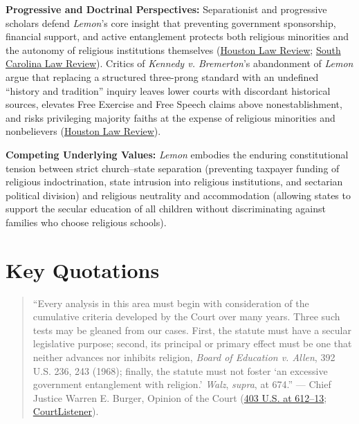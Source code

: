 \documentclass[12pt]{article}
\begin{document}
\textbf{Progressive and Doctrinal Perspectives:} Separationist and progressive scholars defend \textit{Lemon}'s core insight that preventing government sponsorship, financial support, and active entanglement protects both religious minorities and the autonomy of religious institutions themselves (\href{https://houstonlawreview.org/article/92811-unprincipled}{Houston Law Review}; \href{https://sclawreview.org/article/establishment-clause-jurisprudence-and-the-constitutional-limits-on-religion-in-public-schools/}{South Carolina Law Review}). Critics of \textit{Kennedy v. Bremerton}'s abandonment of \textit{Lemon} argue that replacing a structured three-prong standard with an undefined ``history and tradition'' inquiry leaves lower courts with discordant historical sources, elevates Free Exercise and Free Speech claims above nonestablishment, and risks privileging majority faiths at the expense of religious minorities and nonbelievers (\href{https://houstonlawreview.org/article/92811-unprincipled}{Houston Law Review}).

\textbf{Competing Underlying Values:} \textit{Lemon} embodies the enduring constitutional tension between strict church--state separation (preventing taxpayer funding of religious indoctrination, state intrusion into religious institutions, and sectarian political division) and religious neutrality and accommodation (allowing states to support the secular education of all children without discriminating against families who choose religious schools).

\section{Key Quotations}
\begin{quote}
``Every analysis in this area must begin with consideration of the cumulative criteria developed by the Court over many years. Three such tests may be gleaned from our cases. First, the statute must have a secular legislative purpose; second, its principal or primary effect must be one that neither advances nor inhibits religion, \textit{Board of Education v. Allen}, 392 U.S. 236, 243 (1968); finally, the statute must not foster `an excessive government entanglement with religion.' \textit{Walz}, \textit{supra}, at 674.''
--- Chief Justice Warren E. Burger, Opinion of the Court (\href{https://supreme.justia.com/cases/federal/us/403/602/}{403 U.S. at 612--13}; \href{https://www.courtlistener.com/opinion/108380/lemon-v-kurtzman/}{CourtListener}).
\end{quote}
\end{document}
